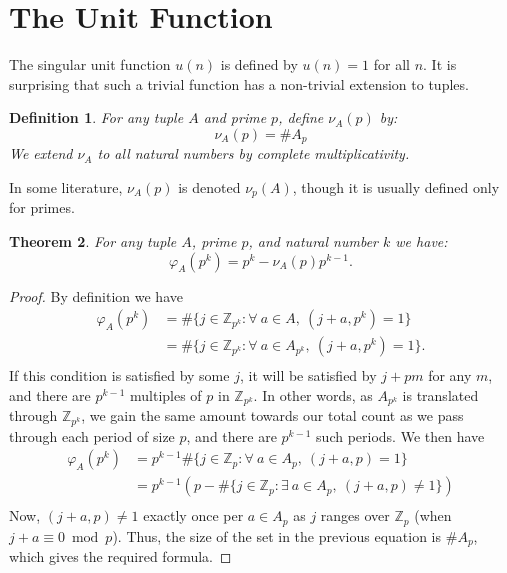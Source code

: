 \documentclass[11pt, leqno]{article}
\newtheorem{theorem}{Theorem}[section]
\newtheorem{definition}[theorem]{Definition}
\begin{document}
\section{The Unit Function}
The singular unit function $u(n)$ is defined by $u(n)=1$ for all $n$.
It is surprising that such a trivial function has a non-trivial extension to tuples.
\begin{definition}
    For any tuple $A$ and prime $p$, define $\nu_A(p)$ by:
    $$\nu_A(p) = \#A_p$$
    We extend $\nu_A$ to all natural numbers by complete multiplicativity.
\end{definition}

In some literature, $\nu_A(p)$ is denoted $\nu_p(A)$, though
it is usually defined only for primes.

\begin{theorem}\label{phi prime powers}
    For any tuple $A$, prime $p$, and natural number $k$ we have:
    $$\varphi_A( p^k ) = p^k - \nu_A(p)p^{k-1}.$$
\end{theorem}
\begin{proof}
    By definition we have
    \begin{align*}
        \varphi_A(p^k) 
        &= \#\{j \in \mathbb{Z}_{p^k} : \forall\ a \in A,\ (j+a,p^k)=1 \} \\
        &= \#\{j \in \mathbb{Z}_{p^k} : \forall\ a \in A_{p^k},\ (j+a,p^k)=1 \}. \\
    \end{align*}
    If this condition is satisfied by some $j$, it will be satisfied
    by $j+pm$ for any $m$, and there are $p^{k-1}$ multiples of $p$ in $\mathbb{Z}_{p^k}$.
    In other words, as $A_{p^k}$ is translated through $\mathbb{Z}_{p^k}$,
    we gain the same amount towards our total count as we pass through
    each period of size $p$, and there are $p^{k-1}$ such periods.
    We then have
    \begin{align*}
        \varphi_A(p^k) 
        &= p^{k-1}\#\{j \in \mathbb{Z}_p : \forall\ a \in A_p,\ (j+a,p)=1 \} \\
        &= p^{k-1}(p-\#\{j \in \mathbb{Z}_p : \exists\ a \in A_p,\ (j+a,p)\not=1 \}) \\
    \end{align*}
    Now, $(j+a,p)\not=1$ exactly once per $a\in A_p$ as $j$ ranges over $\mathbb{Z}_p$
    (when $j+a \equiv 0 \bmod p$).
    Thus, the size of the set in the previous equation is $\#A_p$, which
    gives the required formula.
\end{proof}
\end{document}
